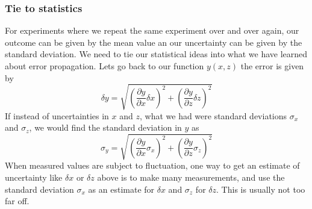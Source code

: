 

\subsubsection{Tie to statistics}

For experiments where we repeat
the same experiment over and over again, our outcome can be given by the
mean value an our uncertainty can be given by the standard deviation. We
need to tie our statistical ideas into what we have learned about error
propagation. Lets go back to our function $y\left( x,z\right) $ the error is
given by 
\begin{equation*}
    \delta y=
    \sqrt{\left(\frac{\partial y}{\partial x}\delta x\right)^2+
    \left(\frac{\partial y}{\partial z}\delta z\right)^2}
\end{equation*}
If instead of uncertainties in $x$ and $z$, what we had were standard 
deviations $\sigma_x$ and $\sigma_z$, we would find the standard deviation in
$y$ as
\begin{equation*}
    \sigma_y=
    \sqrt{\left(\frac{\partial y}{\partial x}\sigma_x\right)^2+
    \left(\frac{\partial y}{\partial z}\sigma_z\right)^2}
\end{equation*}
When measured values are subject to fluctuation, 
one way to get an estimate of uncertainty like $\delta x$ or $\delta z$
above is to make many measurements, and use the standard deviation $\sigma
_{x}$ as an estimate for $\delta x$ and $\sigma _{z}$ for $\delta z.$ This
is usually not too far off.

